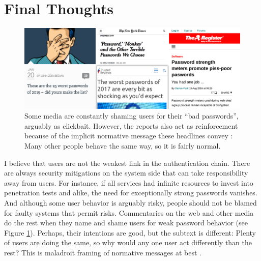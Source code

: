 

\section{Final Thoughts}
\begin{figure}
	\centering
	\includegraphics[width=\linewidth]{figures/summary/shaming-news}
	\caption{\label{fig:summary:shaming-news} Some media are constantly shaming users for their ``bad passwords'', arguably as clickbait. However, the reports also act as reinforcement because of the implicit normative message these headlines convey \cite{Cialdini2003CraftingNormativeMessages}: Many other people behave the same way, so it is fairly normal.}
\end{figure}
I believe that users are not the weakest link in the authentication chain. There are always security mitigations on the system side that can take responsibility away from users. For instance, if all services had infinite resources to invest into penetration tests and alike, the need for exceptionally strong passwords vanishes. And although some user behavior is arguably risky, people should not be blamed for faulty systems that permit risks. Commentaries on the web and other media do the rest when they name and shame users for weak password behavior (see Figure \ref{fig:summary:shaming-news}). Perhaps, their intentions are good, but the subtext is different: Plenty of users are doing the same, so why would any one user act differently than the rest? This is maladroit framing of normative messages at best \cite{Cialdini2003CraftingNormativeMessages}.

